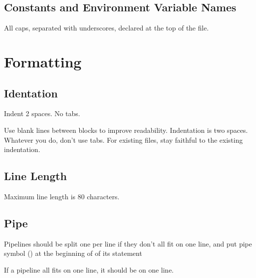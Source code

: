 \documentclass[
]{book}
\newenvironment{Shaded}{\begin{snugshade}}{\end{snugshade}}
\newcommand{\CommentTok}[1]{\textcolor[rgb]{0.56,0.35,0.01}{\textit{#1}}}
\newcommand{\FunctionTok}[1]{\textcolor[rgb]{0.00,0.00,0.00}{#1}}
\newcommand{\KeywordTok}[1]{\textcolor[rgb]{0.13,0.29,0.53}{\textbf{#1}}}
\newcommand{\NormalTok}[1]{#1}
\newcommand{\StringTok}[1]{\textcolor[rgb]{0.31,0.60,0.02}{#1}}
\newcommand{\VariableTok}[1]{\textcolor[rgb]{0.00,0.00,0.00}{#1}}
\begin{document}
\hypertarget{constants-and-environment-variable-names}{%
\subsection{Constants and Environment Variable Names}\label{constants-and-environment-variable-names}}

All caps, separated with underscores, declared at the top of the file.

\hypertarget{formatting}{%
\section{Formatting}\label{formatting}}

\hypertarget{identation}{%
\subsection{Identation}\label{identation}}

Indent 2 spaces. No tabs.

Use blank lines between blocks to improve readability. Indentation is two
spaces. Whatever you do, don't use tabs. For existing files, stay faithful to
the existing indentation.

\hypertarget{line-length}{%
\subsection{Line Length}\label{line-length}}

Maximum line length is 80 characters.

\hypertarget{pipe}{%
\subsection{Pipe}\label{pipe}}

Pipelines should be split one per line if they don't all fit on one line, and
put pipe symbol (\texttt{\textbar{}}) at the beginning of of its statement

If a pipeline all fits on one line, it should be on one line.

\begin{Shaded}
\end{Shaded}
\end{document}
